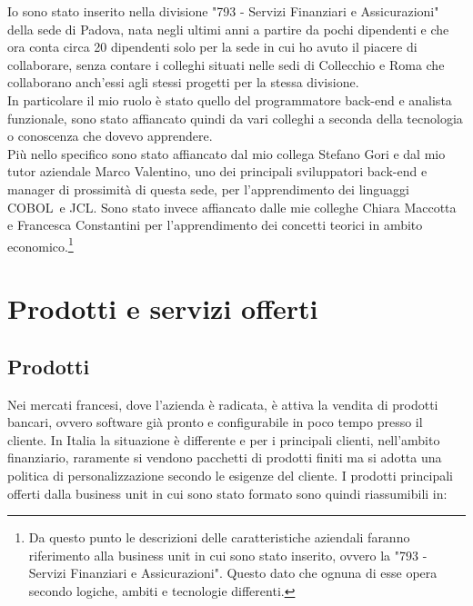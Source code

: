 Io sono stato inserito nella divisione "793 - Servizi Finanziari e Assicurazioni" della sede di Padova, nata negli ultimi anni a partire da pochi dipendenti e che ora conta circa 20 dipendenti solo per la sede in cui ho avuto il piacere di collaborare, senza contare i colleghi situati nelle sedi di Collecchio e Roma che collaborano anch'essi agli stessi progetti per la stessa divisione.\\
In particolare il mio ruolo è stato quello del programmatore back-end e analista funzionale, sono stato affiancato quindi da vari colleghi a seconda della tecnologia o conoscenza che dovevo apprendere. \\
Più nello specifico sono stato affiancato dal mio collega Stefano Gori e dal mio tutor aziendale Marco Valentino, uno dei principali sviluppatori back-end e manager di prossimità di questa sede, per l'apprendimento dei linguaggi COBOL\glossario\ e JCL\glossario. Sono stato invece affiancato dalle mie colleghe Chiara Maccotta e Francesca Constantini per l'apprendimento dei concetti teorici in ambito economico.\footnote{Da questo punto le descrizioni delle caratteristiche aziendali faranno riferimento alla business unit in cui sono stato inserito, ovvero la "793 - Servizi Finanziari e Assicurazioni". Questo dato che ognuna di esse opera secondo logiche, ambiti e tecnologie differenti.}%


\section{Prodotti e servizi offerti}
	
	\subsection{Prodotti}
	
	Nei mercati francesi, dove l'azienda è radicata, è attiva la vendita di prodotti bancari, ovvero software già pronto e configurabile in poco tempo presso il cliente. In Italia la situazione è differente e per i principali clienti, nell'ambito finanziario, raramente si vendono pacchetti di prodotti finiti ma si adotta una politica di personalizzazione secondo le esigenze del cliente. I prodotti principali offerti dalla business unit in cui sono stato formato sono quindi riassumibili in:
		
